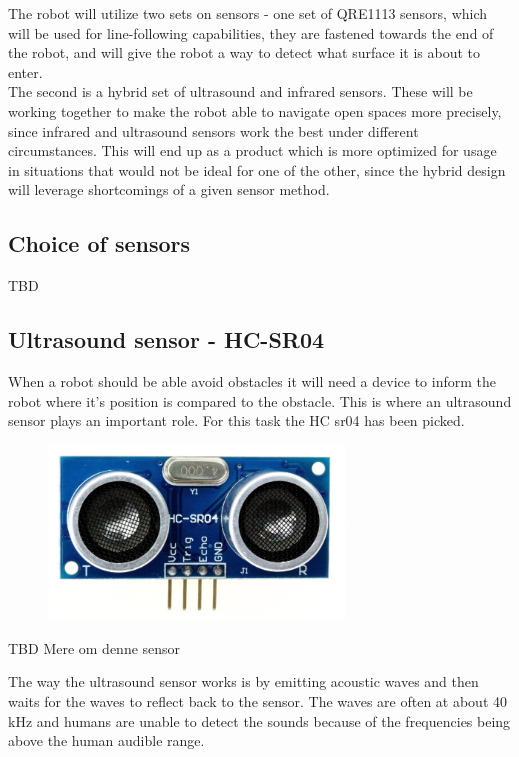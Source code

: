The robot will utilize two sets on sensors - one set of QRE1113 sensors, which will be used for line-following capabilities, they are fastened towards the end of the robot, and will give the robot a way to detect what surface it is about to enter.\\
The second is a hybrid set of ultrasound and infrared sensors. These will be working together to make the robot able to navigate open spaces more precisely, since infrared and ultrasound sensors work the best under different circumstances. This will end up as a product which is more optimized for usage in situations that would not be ideal for one of the other, since the hybrid design will leverage shortcomings of a given sensor method.\\

\subsection{Choice of sensors}
TBD

\subsection{Ultrasound sensor - HC-SR04}
When a robot should be able avoid obstacles it will need a device to inform the robot where it's position is compared to the obstacle. This is where an ultrasound sensor plays an important role. For this task the HC sr04 has been picked.\\

\begin{figure}[!ht]
	\centering
	\includegraphics[width=0.7\textwidth]{figures/hc04.jpg}
	\caption{}
	\label{Hardware diagram}
\end{figure}

TBD Mere om denne sensor
 
The way the ultrasound sensor works is by emitting acoustic waves and then waits for the waves to reflect back to the sensor. The waves are often at about 40 kHz and humans are unable to detect the sounds because of the frequencies being above the human audible range.\

